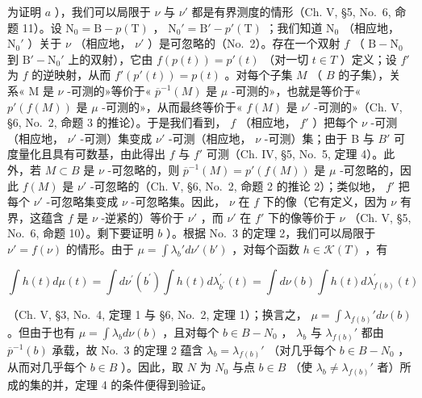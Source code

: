 为证明 \(a\) ），我们可以局限于 \(\nu\) 与 \(\nu'\) 都是有界测度的情形（Ch. V, §5, No.~6, 命题 11）。设 \(\mathrm{N}_0 = \mathrm{B} - p(\mathrm{T})\) ， \(\mathrm{N}_0' = \mathrm{B}' - p'(\mathrm{T})\) ；我们知道 \(\mathrm{N}_0\) （相应地， \(\mathrm{N}_0'\) ）关于 \(\nu\) （相应地， \(\nu'\) ）是可忽略的（No.~2）。存在一个双射 \(f\) （ \(\mathrm{B} - \mathrm{N}_0\) 到 \(\mathrm{B}' - \mathrm{N}_0'\) 上的双射），它由 \(f(p(t)) = p'(t)\) （对一切 \(t \in T\) ）定义；设 \(f'\) 为 \(f\) 的逆映射，从而 \(f'(p'(t)) = p(t)\) 。对每个子集 \(M\) （ \(B\) 的子集），关系« M 是 \(\nu\) -可测的»等价于« \(\overline{p}^{-1}(M)\) 是 \(\mu\) -可测的»，也就是等价于« \(p'(f(M))\) 是 \(\mu\) -可测的»，从而最终等价于« \(f(M)\) 是 \(\nu'\) -可测的»（Ch. V, §6, No.~2, 命题 3 的推论）。于是我们看到， \(f\) （相应地， \(f'\) ）把每个 \(\nu\) -可测（相应地， \(\nu'\) -可测）集变成 \(\nu'\) -可测（相应地， \(\nu\) -可测）集；由于 B 与 \(B'\) 可度量化且具有可数基，由此得出 \(f\) 与 \(f'\) 可测（Ch. IV, §5, No.~5, 定理 4）。此外，若 \(M \subset B\) 是 \(\nu\) -可忽略的，则 \(\overline{p}^{-1}(M) = p'(f(M))\) 是 \(\mu\) -可忽略的，因此 \(f(M)\) 是 \(\nu'\) -可忽略的（Ch. V, §6, No.~2, 命题 2 的推论 2）；类似地， \(f'\) 把每个 \(\nu'\) -可忽略集变成 \(\nu\) -可忽略集。因此， \(\nu\) 在 \(f\) 下的像（它有定义，因为 \(\nu\) 有界，这蕴含 \(f\) 是 \(\nu\) -逆紧的）等价于 \(\nu'\) ，而 \(\nu'\) 在 \(f'\) 下的像等价于 \(\nu\) （Ch. V, §5, No.~6, 命题 10）。剩下要证明 \(b\) ）。根据 No.~3 的定理 2，我们可以局限于 \(\nu' = f(\nu)\) 的情形。由于 \(\mu = \int \lambda_b' d\nu'(b')\) ，对每个函数 \(h \in \mathcal{K}(T)\) ，有

\[
\int h (t) d \mu (t) = \int d \nu^ {\prime} (b ^ {\prime}) \int h (t) d \lambda_ {b ^ {\prime}} ^ {\prime} (t) = \int d \nu (b) \int h (t) d \lambda_ {f (b)} ^ {\prime} (t)
\]

（Ch. V, §3, No.~4, 定理 1 与 §6, No.~2, 定理 1）；换言之， \(\mu = \int \lambda_{f(b)}' d\nu(b)\) 。但由于也有 \(\mu = \int \lambda_b d\nu(b)\) ，且对每个 \(b \in B - N_0\) ， \(\lambda_b\) 与 \(\lambda_{f(b)}'\) 都由 \(\overline{p}^{-1}(b)\) 承载，故 No.~3 的定理 2 蕴含 \(\lambda_b = \lambda_{f(b)}'\) （对几乎每个 \(b \in B - N_0\) ，从而对几乎每个 \(b \in B\) ）。因此，取 \(N\) 为 \(N_0\) 与点 \(b \in B\) （使 \(\lambda_b \neq \lambda_{f(b)}'\) 者）所成的集的并，定理 4 的条件便得到验证。

\appendix
